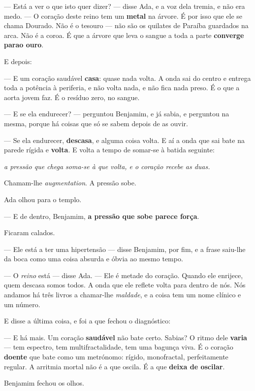 \documentclass[livro.tex]{subfiles}
\begin{document}
--- Está a ver o que isto quer dizer? --- disse Ada, e a voz dela tremia, e não era medo. --- O coração deste reino
tem um \textbf{metal} na árvore. É por isso que ele se chama Dourado. Não é o tesouro --- não são os quilates de Paraíba guardados na arca. Não é a coroa. É que a
árvore que leva o sangue a toda a parte \textbf{converge parao ouro}.

E depois:

--- E um coração saudável \textbf{casa}: quase nada volta. A onda sai do centro e entrega toda a potência à
periferia, e não volta nada, e não fica nada preso. É o que a aorta jovem faz. É o resíduo zero, no sangue.

--- E se ela endurecer? --- perguntou Benjamim, e já sabia, e perguntou na mesma, porque há coisas que só se sabem
depois de as ouvir.

--- Se ela endurecer, \textbf{descasa}, e alguma coisa volta. E aí a onda que sai bate na parede rígida e \textbf{volta}. E
volta a tempo de somar-se à batida seguinte:
\begin{center}\itshape
a pressão que chega soma-se à que volta, e o coração recebe as duas.
\end{center}
Chamam-lhe \emph{augmentation}. A pressão sobe.

Ada olhou para o templo.

--- E de dentro, Benjamim, \textbf{a pressão que sobe parece força}.

\medskip

Ficaram calados.

--- Ele está a ter uma hipertensão --- disse Benjamim, por fim, e a frase saiu-lhe da boca como uma coisa absurda e
óbvia ao mesmo tempo.

--- O \emph{reino} está --- disse Ada. --- Ele é metade do coração. Quando ele enrijece, quem descasa somos todos.
A onda que ele reflete volta para dentro de nós. Nós andamos há três livros a chamar-lhe \emph{maldade}, e a coisa
tem um nome clínico e um número.

E disse a última coisa, e foi a que fechou o diagnóstico:

--- E há mais. Um coração \textbf{saudável} não bate certo. Sabias? O ritmo dele \textbf{varia} --- tem espectro,
tem multifractalidade, tem uma bagunça viva. É o coração \textbf{doente} que bate como um metrónomo: rígido,
monofractal, perfeitamente regular. A arritmia mortal não é a que oscila. É a que \textbf{deixa de oscilar}.

Benjamim fechou os olhos.
\end{document}
